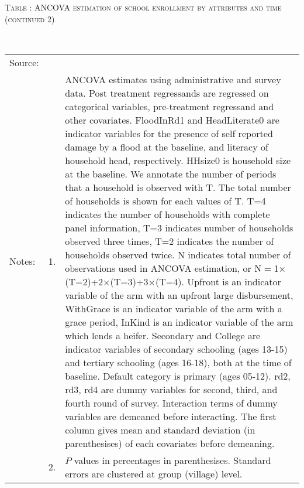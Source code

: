 \hspace{-1cm}\begin{minipage}[t]{14cm}
\hfil\textsc{\normalsize Table \thetable: ANCOVA estimation of school enrollment by attributes and time (continued 2)\label{tab ANCOVA enroll time varying attributes3}}\\
\setlength{\tabcolsep}{1pt}
\setlength{\baselineskip}{8pt}
\renewcommand{\arraystretch}{.525}
\hfil{}\\
\renewcommand{\arraystretch}{.8}
\setlength{\tabcolsep}{1pt}
\hspace{-1cm}\begin{tabular}{>{\hfill\scriptsize}p{1cm}<{}>{\hfill\scriptsize}p{.25cm}<{}>{\scriptsize}p{14cm}<{\hfill}}
Source:& \multicolumn{2}{l}{\scriptsize Estimated with GUK administrative and survey data.}\\
Notes: & 1. & ANCOVA estimates using administrative and survey data. Post treatment regressands are regressed on categorical variables, pre-treatment regressand and other covariates. \textsf{FloodInRd1} and \textsf{HeadLiterate0} are indicator variables for the presence of self reported damage by a flood at the baseline, and literacy of household head, respectively. \textsf{HHsize0} is household size at the baseline. We annotate the number of periods that a household is observed with \textsf{T}. The total number of households is shown for each values of \textsf{T}. \textsf{T=4} indicates the number of households with complete panel information, \textsf{T=3} indicates number of households observed three times, \textsf{T=2} indicates the number of households observed twice. \textsf{N} indicates total number of observations used in ANCOVA estimation, or \textsf{N$=$1$\times$(T=2)+2$\times$(T=3)+3$\times$(T=4)}.  \textsf{Upfront} is an indicator variable of the arm with an upfront large disbursement, \textsf{WithGrace} is an indicator variable of the arm with a grace period, \textsf{InKind} is an indicator variable of the arm which lends a heifer. \textsf{Secondary} and \textsf{College} are indicator variables of secondary schooling (ages 13-15) and tertiary schooling (ages 16-18), both at the time of baseline. Default category is primary (ages 05-12). \textsf{rd2, rd3, rd4} are dummy variables for second, third, and fourth round of survey. Interaction terms of dummy variables are demeaned before interacting. The first column gives mean and standard deviation (in parenthesises) of each covariates before demeaning.\\
& 2. & $P$ values in percentages in parenthesises. Standard errors are clustered at group (village) level.%
\end{tabular}
\end{minipage}

